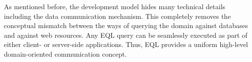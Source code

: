   As mentioned before, the development model hides many technical details including the data communication mechanism.
  This completely removes the conceptual mismatch between the ways of querying the domain against databases and against web resources.
  Any EQL query can be seamlessly executed as part of either client- or server-side applications.
  Thus, EQL provides a uniform high-level domain-oriented communication concept.